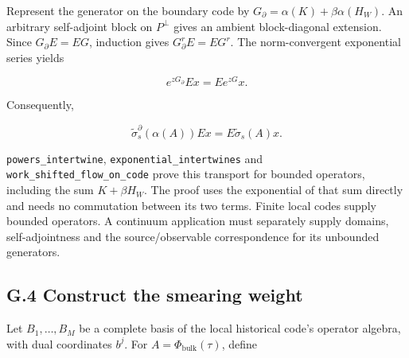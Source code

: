 \documentclass[
]{article}
\begin{document}
Represent the generator on the boundary code by
\(G_\partial=\alpha(K)+\beta\alpha(H_W)\). An arbitrary self-adjoint
block on \(P^\perp\) gives an ambient block-diagonal extension. Since
\(G_\partial E=EG\), induction gives \(G_\partial^rE=EG^r\). The
norm-convergent exponential series yields

\[
e^{zG_\partial}Ex=E e^{zG}x.
\]

Consequently,

\[
\widetilde\sigma_s^\partial(\alpha(A))Ex
=E\widetilde\sigma_s(A)x.
\]

\texttt{p\allowbreak{}o\allowbreak{}w\allowbreak{}e\allowbreak{}r\allowbreak{}s\allowbreak{}\_\allowbreak{}i\allowbreak{}n\allowbreak{}t\allowbreak{}e\allowbreak{}r\allowbreak{}t\allowbreak{}w\allowbreak{}i\allowbreak{}n\allowbreak{}e},
\texttt{e\allowbreak{}x\allowbreak{}p\allowbreak{}o\allowbreak{}n\allowbreak{}e\allowbreak{}n\allowbreak{}t\allowbreak{}i\allowbreak{}a\allowbreak{}l\allowbreak{}\_\allowbreak{}i\allowbreak{}n\allowbreak{}t\allowbreak{}e\allowbreak{}r\allowbreak{}t\allowbreak{}w\allowbreak{}i\allowbreak{}n\allowbreak{}e\allowbreak{}s}
and
\texttt{w\allowbreak{}o\allowbreak{}r\allowbreak{}k\allowbreak{}\_\allowbreak{}s\allowbreak{}h\allowbreak{}i\allowbreak{}f\allowbreak{}t\allowbreak{}e\allowbreak{}d\allowbreak{}\_\allowbreak{}f\allowbreak{}l\allowbreak{}o\allowbreak{}w\allowbreak{}\_\allowbreak{}o\allowbreak{}n\allowbreak{}\_\allowbreak{}c\allowbreak{}o\allowbreak{}d\allowbreak{}e}
prove this transport for bounded operators, including the sum
\(K+\beta H_W\). The proof uses the exponential of that sum directly and
needs no commutation between its two terms. Finite local codes supply
bounded operators. A continuum application must separately supply
domains, self-adjointness and the
s\allowbreak{}o\allowbreak{}u\allowbreak{}r\allowbreak{}c\allowbreak{}e\allowbreak{}/\allowbreak{}o\allowbreak{}b\allowbreak{}s\allowbreak{}e\allowbreak{}r\allowbreak{}v\allowbreak{}a\allowbreak{}b\allowbreak{}l\allowbreak{}e
correspondence for its unbounded generators.

\subsection{G.4 Construct the smearing
weight}\label{g.4-construct-the-smearing-weight}

Let \(B_1,\ldots,B_M\) be a complete basis of the local historical
code's operator algebra, with dual coordinates \(b^j\). For
\(A=\Phi_{\mathrm{bulk}}(\tau)\), define
\end{document}
